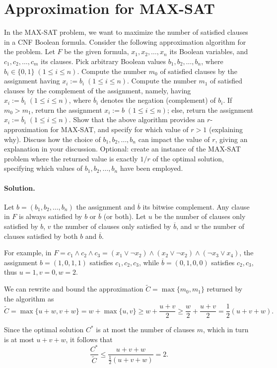 \section{Approximation for MAX-SAT}

In the MAX-SAT problem, we want to maximize the number of satisfied clauses in a CNF Boolean formula. Consider the following approximation algorithm for the problem. Let $F$ be the given formula, $x_1, x_2, \dots, x_n$ its Boolean variables, and $c_1, c_2, \dots, c_m$ its clauses. Pick arbitrary Boolean values $b_1, b_2, \dots, b_n$, where $b_i \in  \{0,1\} \; (1 \leq i \leq n)$. Compute the number $m_0$ of satisfied clauses by the assignment having $x_i := b_i \; (1 \leq i \leq n)$. Compute the number $m_1$ of satisfied clauses by the complement of the assignment, namely, having $x_i := \overline{b}_i \; (1 \leq i \leq n)$, where $\overline{b}_i$ denotes the negation (complement) of $b_i$. If $m_0 > m_1$, return the assignment $x_i := b \; (1 \leq i \leq n)$; else, return the assignment $x_i := \overline{b}_i \; (1 \leq i \leq n)$. Show that the above algorithm provides an $r$-approximation for MAX-SAT, and specify for which value of $r > 1$ (explaining why). Discuss how the choice of $b_1, b_2, \dots, b_n$ can impact the value of $r$, giving an explanation in your discussion. Optional: create an instance of the MAX-SAT problem where the returned value is exactly $1/r$ of the optimal solution, specifying which values of $b_1, b_2, \dots, b_n$ have been employed.

\vspace{0.5cm}
\paragraph{Solution.} Let $b=(b_1, b_2, \dots, b_n)$ the assignment and $\overline{b}$ its bitwise complement. Any clause in $F$ is always satisfied by $b$ or $\overline{b}$ (or both). Let $u$ be the number of clauses only satisfied by $b$, $v$ the number of clauses only satisfied by $\overline{b}$, and $w$ the number of clauses satisfied by both $b$ and $\overline{b}$.

For example, in $F=c_1 \wedge c_2 \wedge c_3 = (x_1 \vee \neg x_2) \wedge (x_2 \vee \neg x_2) \wedge (\neg x_3 \vee x_4)$, the assignment $b = (1, 0, 1, 1)$ satisfies $c_1, c_2, c_3$, while $\overline{b} = (0, 1, 0, 0)$ satisfies $c_2, c_3$, thus $u=1, v=0, w=2$.

We can rewrite and bound the approximation $\widetilde{C} = \max\{m_0, m_1\}$ returned by the algorithm as $$\widetilde{C} = \max\{u+w, v+w\}=w+\max\{u, v\} \geq w + \frac{u+v}{2} \geq \frac{w}{2} + \frac{u+v}{2} = \frac{1}{2} (u+v+w).$$

Since the optimal solution $C^*$ is at most the number of clauses $m$, which in turn is at most $u+v+w$, it follows that
$$\frac{C^*}{\widetilde{C}} \leq \frac{u+v+w}{\frac{1}{2}(u+v+w)} = 2.$$